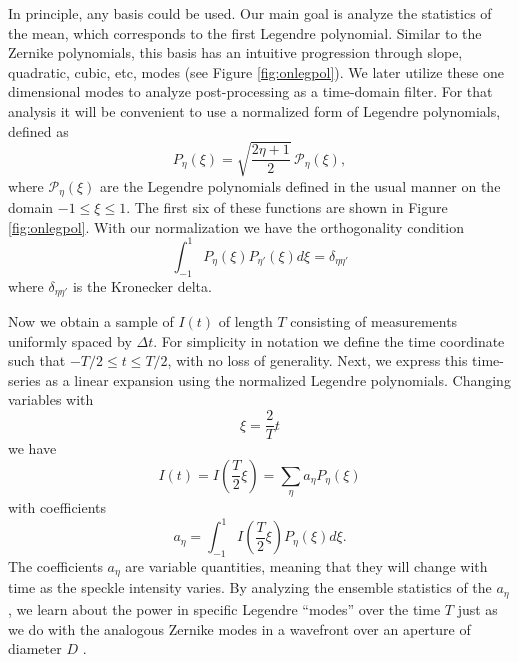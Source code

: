 \documentclass[10pt,preprint]{aastex631}
\begin{document}
In principle, any basis could be used.  Our main goal is analyze the statistics of the mean, which corresponds to the first Legendre polynomial.  Similar to the Zernike polynomials, this basis has an intuitive progression through slope, quadratic, cubic, etc, modes (see Figure \ref{fig:onlegpol}). We later utilize these one dimensional modes to analyze post-processing as a time-domain filter.  For that analysis it will be convenient to use a normalized form of Legendre polynomials, defined as
\begin{equation}
P_{\eta}(\xi) = \sqrt{\frac{2\eta+1}{2}}\, \mathscr{P}_\eta(\xi),
\label{eqn:basis}
\end{equation}
where $\mathscr{P}_\eta(\xi)$ are the Legendre polynomials defined in the usual manner \citep[cf.][]{Olver:2010:NHMF} on the domain $-1 \le \xi \le 1$. The first six of these functions are shown in Figure \ref{fig:onlegpol}.  With our normalization we have the orthogonality condition
\begin{equation}
\int_{-1}^{1}P_\eta(\xi)P_{\eta'}(\xi) d\xi = \delta_{\eta\eta'}
\label{eqn:orthonormal}
\end{equation}
where $\delta_{\eta\eta'}$ is the Kronecker delta. 

Now we obtain a sample of $I(t)$ of length $T$ consisting of measurements uniformly spaced by $\Delta t$.  For simplicity in notation we define the time coordinate such that $-T/2 \le t \le T/2$, with no loss of generality.  Next, we express this time-series as a linear expansion using the normalized Legendre polynomials.  Changing variables with
\begin{equation}
\xi = \frac{2}{T}t
\end{equation}
we have
\begin{equation}
I(t) = I\left(\frac{T}{2}\xi\right) = \sum_\eta a_\eta P_\eta(\xi)
\label{eqn:basisexpansion}
\end{equation}
with coefficients
\begin{equation}
a_\eta = \int_{-1}^{1} I\left(\frac{T}{2}\xi\right)P_\eta(\xi) d\xi.
\label{eqn:expansecoeff}
\end{equation}
The coefficients $a_\eta$ are variable quantities, meaning that they will change with time as the speckle intensity varies.  By analyzing the ensemble statistics of the $a_\eta$, we learn about the power in specific Legendre ``modes'' over the time $T$ just as we do with the analogous Zernike modes in a wavefront over an aperture of diameter $D$ \citep{1976JOSA...66..207N}.
\end{document}
